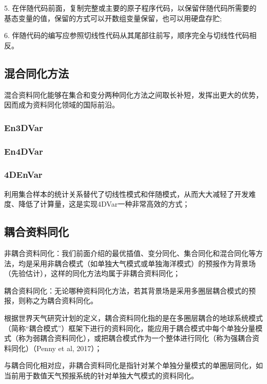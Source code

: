 \documentclass{article}
\begin{document}
5. 在伴随代码前面，复制完整或主要的原子程序代码，以保留伴随代码所需要的基态变量的值，保留的方式可以开数组变量保留，也可以用硬盘存贮;

6. 伴随代码的编写应参照切线性代码从其尾部往前写，顺序完全与切线性代码相反。

\subsection{混合同化方法}
混合资料同化能够在集合和变分两种同化方法之间取长补短，发挥出更大的优势，因而成为资料同化领域的国际前沿。

\subsubsection{En3DVar}
\subsubsection{En4DVar}
\subsubsection{4DEnVar}
利用集合样本的统计关系替代了切线性模式和伴随模式，从而大大减轻了开发难度、降低了计算量，这是实现4DVar一种非常高效的方式；

\subsection{耦合资料同化}
非耦合资料同化：我们前面介绍的最优插值、变分同化、集合同化和混合同化等方法，均是采用非耦合模式（如单独大气模式或单独海洋模式）的预报作为背景场（先验估计），这样的同化方法均属于非耦合资料同化；

耦合资料同化：无论哪种资料同化方法，若其背景场是采用多圈层耦合模式的预报，则称之为耦合资料同化。

根据世界天气研究计划的定义，耦合资料同化指的是在多圈层耦合的地球系统模式（简称“耦合模式”）框架下进行的资料同化，能应用于耦合模式中每个单独分量模式（称为弱耦合资料同化），或把耦合模式作为一个整体进行同化（称为强耦合资料同化）（Penny et al, 2017）；

与耦合同化相对应，非耦合资料同化是指针对某个单独分量模式的单圈层同化，如当前用于数值天气预报系统的针对单独大气模式的资料同化。
\end{document}
